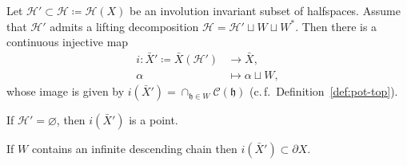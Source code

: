 \begin{lemma}[{\cite[Lemma~2.6]{MR3509968}}]
  \label{lem:lifting}
  Let \(\mathcal{H}' \subset \mathcal{H} \coloneqq \mathcal{H}(X)\) be an involution invariant subset of halfspaces. Assume that \(\mathcal{H}'\) admits a lifting decomposition \(\mathcal{H} = \mathcal{H}' \sqcup W \sqcup W^\ast\). Then there is a continuous injective map
  \begin{align*}
    i\colon \bar X' \coloneqq \bar X(\mathcal{H}') & \to \bar X,\\
            \alpha & \mapsto \alpha \sqcup W,
  \end{align*}
  whose image is given by \(i(\bar X') = \cap_{\mathfrak{h} \in W} \mathcal{C}(\mathfrak{h})\) (c.\,f.\ Definition~\ref{def:pot-top}).

  If \(\mathcal{H}' = \varnothing\), then \(i(\bar X')\) is a point.

  If \(W\) contains an infinite descending chain then \(i(\bar X') \subset \partial X\).
\end{lemma}

